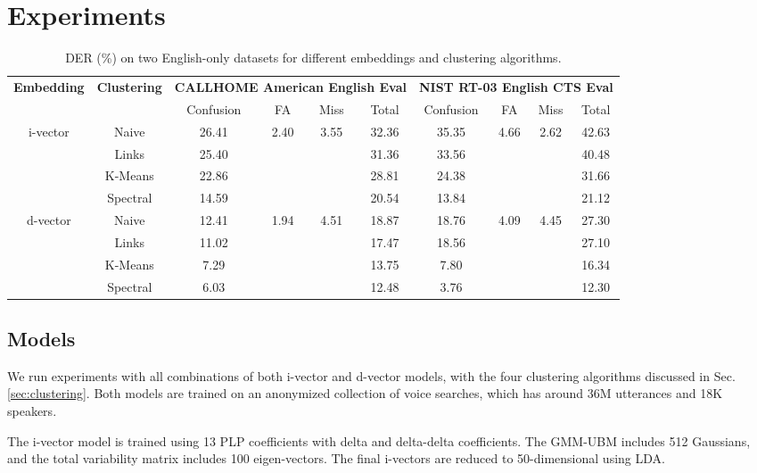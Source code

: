 \documentclass{article}
\begin{document}
\section{Experiments}
\label{sec:exp}

\begin{table*}
\centering
  \caption{DER (\%) on two English-only datasets for different embeddings and clustering
  algorithms.
  }
  \label{tab:der}
  \begin{tabular}{| c | c | c | c | c | c | c | c | c | c |}
    \hline
    \multirow{2}{*}{\bf Embedding} & \multirow{2}{*}{\bf Clustering}
    & \multicolumn{4}{|c|}{\bf CALLHOME American English Eval}
    & \multicolumn{4}{|c|}{\bf NIST RT-03 English CTS Eval} \\ \cline{3-10}
    & & Confusion & FA & Miss & Total & Confusion & FA & Miss & Total \\ \hline
    \multirow{4}{*}{i-vector} & Naive
    & 26.41 & \multirow{4}{*}{2.40} & \multirow{4}{*}{3.55} & 32.36 & 35.35 & \multirow{4}{*}{4.66} & \multirow{4}{*}{2.62} & 42.63 \\
    & Links
    & 25.40 & & & 31.36 & 33.56 & & & 40.48 \\
    & K-Means
    & 22.86 & & & 28.81 & 24.38 & & & 31.66 \\
    & Spectral
    & 14.59 & & & 20.54 & 13.84 & & & 21.12 \\ \hline
    \multirow{4}{*}{d-vector} & Naive
    & 12.41 & \multirow{4}{*}{1.94} & \multirow{4}{*}{4.51} & 18.87 & 18.76 & \multirow{4}{*}{4.09} & \multirow{4}{*}{4.45} & 27.30 \\
    & Links
    & 11.02 & & & 17.47 & 18.56 & & & 27.10 \\
    & K-Means
    & 7.29 & & & 13.75 & 7.80 & & & 16.34 \\
    & Spectral
    & 6.03 & & & 12.48 & 3.76 & & & 12.30 \\ \hline
  \end{tabular}
\end{table*}

\subsection{Models}
We run experiments with all combinations of both i-vector and d-vector models, with the four clustering algorithms discussed in Sec. \ref{sec:clustering}.
Both models are trained on an anonymized collection of voice searches,
which has around 36M utterances and 18K speakers.

The i-vector model is trained using 13 PLP coefficients with delta and delta-delta coefficients.
The GMM-UBM includes 512 Gaussians,
and the total variability matrix includes 100 eigen-vectors.
The final i-vectors are reduced to 50-dimensional using LDA.
\end{document}
